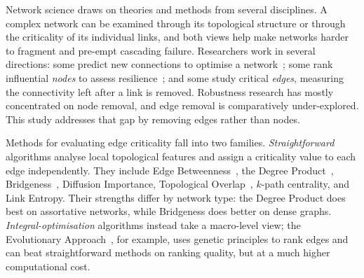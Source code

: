 \documentclass[runningheads,11pt]{article}
\begin{document}
Network science draws on theories and methods from several disciplines. A
complex network can be examined through its topological structure or through the
criticality of its individual links, and both views help make networks harder to
fragment and pre-empt cascading failure. Researchers work in several directions: some predict
new connections to optimise a network~\cite{newman2003structure}; some rank
influential \emph{nodes} to assess resilience~\cite{albert2002statistical}; and
some study critical \emph{edges}, measuring the connectivity left after a link is
removed. Robustness research has mostly concentrated on node removal, and edge
removal is comparatively under-explored. This study addresses that gap by
removing edges rather than nodes.

Methods for evaluating edge criticality fall into two families.
\emph{Straightforward} algorithms analyse local topological features and assign
a criticality value to each edge independently. They include Edge
Betweenness~\cite{xia2008attack}, the Degree
Product~\cite{wang2008universal}, Bridgeness~\cite{cheng2010bridgeness},
Diffusion Importance, Topological Overlap~\cite{onnela2007structure}, $k$-path
centrality, and Link Entropy. Their strengths differ by network type: the Degree
Product does best on assortative networks, while Bridgeness does better on dense
graphs. \emph{Integral-optimisation} algorithms instead take a macro-level view;
the Evolutionary Approach~\cite{lubashevskiy2023evolutionary}, for example, uses
genetic principles to rank edges and can beat straightforward methods on ranking
quality, but at a much higher computational cost.
\end{document}
